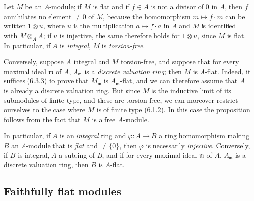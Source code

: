 \begin{env}[6.3.4]
\label{0.6.3.4}
Let $M$ be an $A$-module; if $M$ is flat and if $f\in A$ is not a divisor
of $0$ in $A$, then $f$ annihilates no element $\neq0$ of $M$, because
the homomorphism $m\mapsto f\cdot m$ can be written $1\otimes u$, where $u$ is the
multiplication $a\mapsto f\cdot a$ in $A$ and $M$ is identified with
$M\otimes_A A$; if $u$ is injective, the same therefore holds for
$1\otimes u$, since $M$ is flat. In particular, if $A$ is
\emph{integral}, $M$ is \emph{torsion-free}.

Conversely, suppose $A$ integral and $M$ torsion-free, and suppose that for
every maximal ideal $\mathfrak{m}$ of $A$, $A_\mathfrak{m}$ is a
\emph{discrete valuation ring}; then $M$ is $A$-flat. Indeed, it suffices
(6.3.3) to prove that $M_\mathfrak{m}$ is $A_\mathfrak{m}$-flat, and
we can therefore assume that $A$ is already a discrete valuation ring. But
since $M$ is the inductive limit of its submodules of finite type, and these
are torsion-free, we can moreover restrict ourselves to the case where $M$ is of
finite type (6.1.2). In this case the proposition follows from the fact that $M$ is a
free $A$-module.

In particular, if $A$ is an \emph{integral} ring and
$\varphi:A\to B$ a ring homomorphism making $B$ an $A$-module that is
\emph{flat} and $\neq\{0\}$, then $\varphi$ is necessarily \emph{injective}.
Conversely, if $B$ is integral, $A$ a subring of $B$, and if for every
maximal ideal $\mathfrak{m}$ of $A$, $A_\mathfrak{m}$ is a discrete
valuation ring, then $B$ is $A$-flat.
\end{env}

\subsection{Faithfully flat modules}
\label{subsection:0.6.4}

